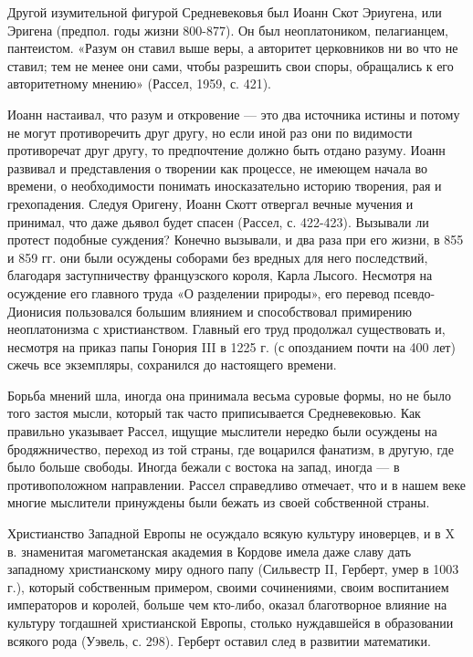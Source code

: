 Другой изумительной фигурой Средневековья был Иоанн Скот Эриугена,
или Эригена (предпол. годы жизни 800-877). Он был неоплатоником,
пелагианцем, пантеистом. «Разум он ставил выше веры, а авторитет
церковников ни во что не ставил; тем не менее они сами, чтобы
разрешить свои споры, обращались к его авторитетному мнению» (Рассел,
1959, с. 421).

Иоанн настаивал, что разум и откровение --- это два источника истины и
потому не могут противоречить друг другу, но если иной раз они по
видимости противоречат друг другу, то предпочтение должно быть отдано
разуму. Иоанн развивал и представления о творении как процессе, не
имеющем начала во времени, о необходимости понимать иносказательно
историю творения, рая и грехопадения. Следуя Оригену, Иоанн Скотт
отвергал вечные мучения и принимал, что даже дьявол будет спасен
(Рассел, с. 422-423). Вызывали ли протест подобные суждения? Конечно
вызывали, и два раза при его жизни, в 855 и 859 гг. они были осуждены
соборами без вредных для него последствий, благодаря заступничеству
французского короля, Карла Лысого. Несмотря на осуждение его главного
труда «О разделении природы», его перевод псевдо-Дионисия пользовался
большим влиянием и способствовал примирению неоплатонизма с
христианством. Главный его труд продолжал существовать и, несмотря на
приказ папы Гонория III в 1225 г. (с опозданием почти на 400 лет)
сжечь все экземпляры, сохранился до настоящего времени.

Борьба мнений шла, иногда она принимала весьма суровые формы, но не
было того застоя мысли, который так часто приписывается Средневековью.
Как правильно указывает Рассел, ищущие мыслители нередко были осуждены
на бродяжничество, переход из той страны, где воцарился фанатизм, в
другую, где было больше свободы. Иногда бежали с востока на запад,
иногда --- в противоположном направлении. Рассел справедливо отмечает,
что и в нашем веке многие мыслители принуждены были бежать из своей
собственной страны.

Христианство Западной Европы не осуждало всякую культуру иноверцев, и
в X в. знаменитая магометанская академия в Кордове имела даже славу
дать западному христианскому миру одного папу (Сильвестр II, Герберт,
умер в 1003 г.), который собственным примером, своими сочинениями,
своим воспитанием императоров и королей, больше чем кто-либо, оказал
благотворное влияние на культуру тогдашней христианской Европы,
столько нуждавшейся в образовании всякого рода (Уэвель, с. 298).
Герберт оставил след в развитии математики.

